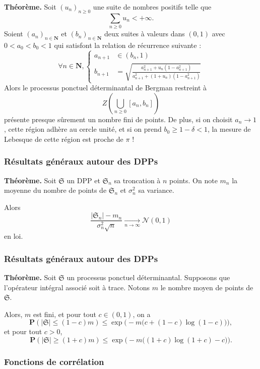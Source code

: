 \documentclass[9pt]{beamer}
\begin{document}
\begin{frame}
    \textbf{Théorème.} Soit \( (u_n)_{n \geqslant 0} \) une suite de nombres positifs telle que  
\[ 
    \sum_{n \ge 0} u_n < +\infty. 
\]  
Soient \( (a_n)_{n \in \mathbf{N}} \) et \( (b_n)_{n \in \mathbf{N}} \) deux suites à valeurs dans \( (0,1) \) avec \( 0 < a_0 < b_0 < 1 \) qui satisfont la relation de récurrence suivante :  
\[
\forall n \in \mathbf{N}, 
\left\{
\begin{aligned}
    a_{n+1} &\in (b_n, 1) \\[6pt]
    b_{n+1} &= \sqrt{ \frac{a_{n+1}^2 + u_n (1 - a_{n+1}^2)}{a_{n+1}^2 + (1 + u_n)(1 - a_{n+1}^2)} }
\end{aligned}
\right.
\]
Alors le processus ponctuel déterminantal de Bergman restreint à  
\[
    Z\left( \bigcup_{n \ge 0} [a_n, b_n] \right)
\]
présente presque sûrement un nombre fini de points. De plus, si on choisit $ a_n \to 1 $, cette région adhère au cercle unité, et si on prend $ b_0 \geqslant 1 - \delta < 1 $, la mesure de Lebesque de cette région est proche de $ \pi $ !

\end{frame}\begin{frame}\frametitle{Résultats généraux autour des DPPs}

    \textbf{Théorème.} Soit $ \mathfrak S$ un DPP et $ \mathfrak S_n $ sa troncation à $n$ points. On note $ m_n $ la moyenne du nombre de points de $ \mathfrak S_n $ et $ \sigma^2_n $ sa variance. 

    Alors 
    \[
        \frac{| \mathfrak S_n | - m_n }{\sigma_n^2\sqrt n} \xrightarrow[n \to \infty]{} \mathcal N (0,1)
    \]
    en loi.

\end{frame}\begin{frame}\frametitle{Résultats généraux autour des DPPs}

    \textbf{Théorème.} Soit \(\mathfrak{S}\) un processus ponctuel déterminantal. Supposons que l'opérateur intégral associé soit à trace. Notons \(m\) le nombre moyen de points de \(\mathfrak{S}\). 
    
    Alors, \(m\) est fini, et pour tout \(c \in (0,1)\), on a  
    \[
        \mathbf{P}(|\mathfrak{S}| \leqslant (1-c)m) \leqslant \exp\big(-m \big(c + (1-c) \log(1-c)\big)\big),
    \]
    et pour tout \(c > 0\),  
    \[
        \mathbf{P}(|\mathfrak{S}| \geqslant (1+c)m) \leqslant \exp\big(-m \big((1+c) \log(1+c) - c\big)\big).
    \]

\end{frame}\begin{frame}\frametitle{Fonctions de corrélation}


\end{frame}
\end{document}
